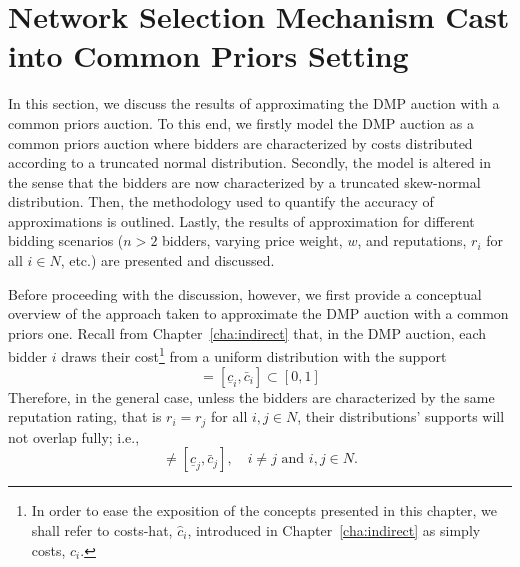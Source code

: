 \section{Network Selection Mechanism Cast into Common Priors Setting} %
\label{sec:network_selection_mechanism_cast_into_common_priors_setting_approximation}
In this section, we discuss the results of approximating the DMP auction with a common priors auction. To this end, we firstly model the DMP auction as a common priors auction where bidders are characterized by costs distributed according to a truncated normal distribution. Secondly, the model is altered in the sense that the bidders are now characterized by a truncated skew-normal distribution. Then, the methodology used to quantify the accuracy of approximations is outlined. Lastly, the results of approximation for different bidding scenarios ($n>2$ bidders, varying price weight, $w$, and reputations, $r_i$ for all $i\in N$, etc.) are presented and discussed.

Before proceeding with the discussion, however, we first provide a conceptual overview of the approach taken to approximate the DMP auction with a common priors one. Recall from Chapter~\ref{cha:indirect} that, in the DMP auction, each bidder $i$ draws their cost\footnote{In order to ease the exposition of the concepts presented in this chapter, we shall refer to costs-hat, $\hat{c}_i$, introduced in Chapter~\ref{cha:indirect} as simply costs, $c_i$.} from a uniform distribution with the support
\begin{equation*}
  [(1-w)r_i, (1-w)r_i + w] = [\underline{c}_i, \bar{c}_i] \subset [0,1]
\end{equation*}
Therefore, in the general case, unless the bidders are characterized by the same reputation rating, that is $r_i=r_j$ for all $i,j\in N$, their distributions' supports will not overlap fully; i.e.,
\begin{equation*}
  [\underline{c}_i,\bar{c}_i] \neq [\underline{c}_j,\bar{c}_j], \quad i\neq j \text{ and } i,j\in N.
\end{equation*}

